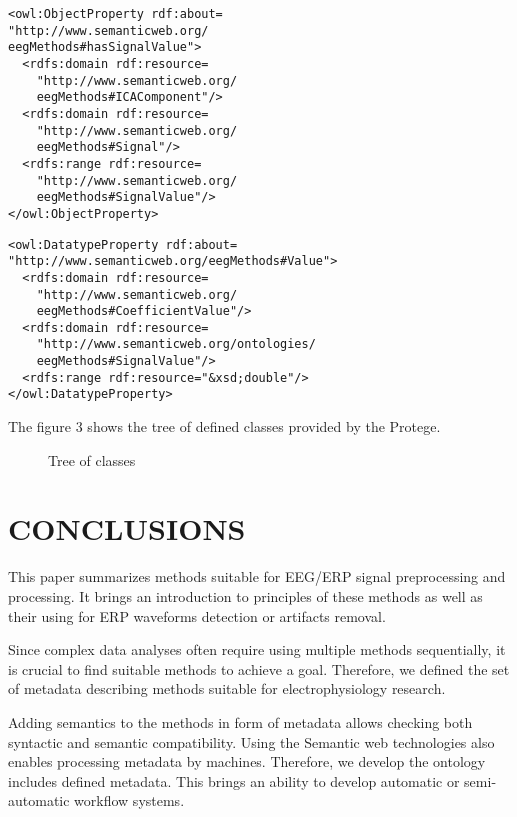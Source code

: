 \documentclass[a4paper,twoside]{article}
\begin{document}
\begin{small}
\begin{verbatim}
<owl:ObjectProperty rdf:about=
"http://www.semanticweb.org/
eegMethods#hasSignalValue">
  <rdfs:domain rdf:resource=
    "http://www.semanticweb.org/
    eegMethods#ICAComponent"/>
  <rdfs:domain rdf:resource=
    "http://www.semanticweb.org/
    eegMethods#Signal"/>
  <rdfs:range rdf:resource=
    "http://www.semanticweb.org/
    eegMethods#SignalValue"/>
</owl:ObjectProperty>
\end{verbatim}
\end{small}

\begin{small}
\begin{verbatim}
<owl:DatatypeProperty rdf:about=
"http://www.semanticweb.org/eegMethods#Value">
  <rdfs:domain rdf:resource=
    "http://www.semanticweb.org/
    eegMethods#CoefficientValue"/>
  <rdfs:domain rdf:resource=
    "http://www.semanticweb.org/ontologies/
    eegMethods#SignalValue"/>
  <rdfs:range rdf:resource="&xsd;double"/>
</owl:DatatypeProperty>
\end{verbatim}
\end{small}

\noindent The figure 3 shows the tree of defined classes provided by the Protege.

\begin{figure}[!h]

  \centering
   {}
  \caption{Tree of classes}
  \label{fig:classTree}
 \end{figure}

\section{\uppercase{Conclusions}}
\label{sec:conclusion}

\noindent This paper summarizes methods suitable for EEG/ERP signal
preprocessing and processing. It brings an introduction
to principles of these methods as well as their using
for ERP waveforms detection or artifacts removal.

Since complex data analyses often require using multiple methods sequentially, it is crucial to find suitable methods to achieve a goal. Therefore, we defined the set of metadata describing methods suitable for electrophysiology research.

Adding semantics to the methods in form of metadata allows checking both syntactic and semantic compatibility. Using the Semantic web technologies also enables processing metadata by machines. Therefore, we develop the ontology includes defined metadata. This brings an ability to develop automatic or semi-automatic workflow systems.
\end{document}
